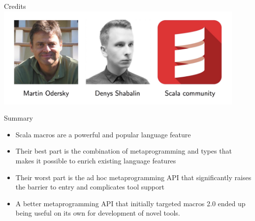 \documentclass[svgnames,dvipsnames,hyperref={bookmarks=false},usepdftitle=false]{beamer}
\begin{document}

\begin{frame}[t,fragile]{Credits}
\vskip35pt
\includegraphics[height=5cm]{credits.jpeg}
\end{frame}

\begin{frame}{Summary}
\begin{itemize}
\item Scala macros are a powerful and popular language feature
\item Their best part is the combination of metaprogramming and types
that makes it possible to enrich existing language features
\item Their worst part is the ad hoc metaprogramming API
that significantly raises the barrier to entry and complicates tool support
\item A better metaprogramming API that initially targeted macros 2.0
ended up being useful on its own for development of novel tools.
\end{itemize}
\end{frame}
\end{document}
